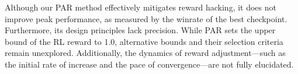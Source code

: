 Although our PAR method effectively mitigates reward hacking, it does not improve peak performance, as measured by the winrate of the best checkpoint. Furthermore, its design principles lack precision. While PAR sets the upper bound of the RL reward to 1.0, alternative bounds and their selection criteria remain unexplored. Additionally, the dynamics of reward adjustment—such as the initial rate of increase and the pace of convergence—are not fully elucidated. 
